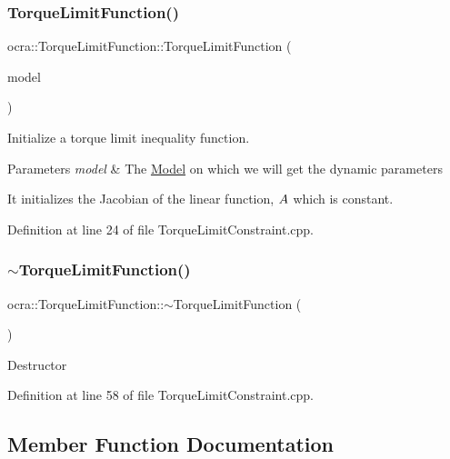 \subsubsection{\texorpdfstring{Torque\+Limit\+Function()}{TorqueLimitFunction()}}
{\footnotesize\ttfamily ocra\+::\+Torque\+Limit\+Function\+::\+Torque\+Limit\+Function (\begin{DoxyParamCaption}\item[{const \hyperlink{classocra_1_1Model}{Model} \&}]{model }\end{DoxyParamCaption})}

Initialize a torque limit inequality function.


\begin{DoxyParams}{Parameters}
{\em model} & The \hyperlink{classocra_1_1Model}{Model} on which we will get the dynamic parameters\\
\hline
\end{DoxyParams}
It initializes the Jacobian of the linear function, $ A $ which is constant. 

Definition at line 24 of file Torque\+Limit\+Constraint.\+cpp.

\hypertarget{classocra_1_1TorqueLimitFunction_a810eb8dd094bb809859a6adf9c6c4a18}{}\label{classocra_1_1TorqueLimitFunction_a810eb8dd094bb809859a6adf9c6c4a18} 
\subsubsection{\texorpdfstring{$\sim$\+Torque\+Limit\+Function()}{~TorqueLimitFunction()}}
{\footnotesize\ttfamily ocra\+::\+Torque\+Limit\+Function\+::$\sim$\+Torque\+Limit\+Function (\begin{DoxyParamCaption}{ }\end{DoxyParamCaption})}

Destructor 

Definition at line 58 of file Torque\+Limit\+Constraint.\+cpp.



\subsection{Member Function Documentation}
\hypertarget{classocra_1_1TorqueLimitFunction_a455115a2dc26da5603bbf843bb88ef38}{}\label{classocra_1_1TorqueLimitFunction_a455115a2dc26da5603bbf843bb88ef38} 
